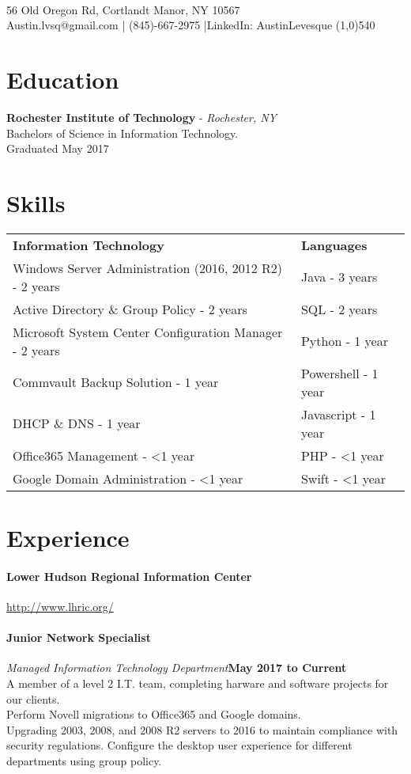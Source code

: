 \documentclass[10pt]{Article}
\begin{document}
\begin{center}
\\
56 Old Oregon Rd, Cortlandt Manor, NY 10567\\
Austin.lvsq@gmail.com | (845)-667-2975 |LinkedIn: AustinLevesque
\line(1,0){540}
\end{center}
\section*{\large Education}
{\bf Rochester Institute of Technology} - {\it Rochester, NY}\\
Bachelors of Science in Information Technology.\\
Graduated May 2017
\section*{\large Skills}
\begin{tabu}{@{}X[4] @{}X[1]}%
\bf Information Technology & \bf Languages \\
Windows Server Administration (2016, 2012 R2) - 2 years & Java - 3 years\\
Active Directory \& Group Policy - 2 years & SQL - 2 years\\
Microsoft System Center Configuration Manager - 2 years & Python - 1 year\\
Commvault Backup Solution - 1 year & Powershell - 1 year\\
DHCP \& DNS - 1 year & Javascript - 1 year\\
Office365 Management - \textless 1 year & PHP - \textless 1 year \\
Google Domain Administration - \textless 1 year & Swift - \textless 1 year
\end{tabu}
\section*{\large Experience}
\paragraph{{\bf Lower Hudson Regional Information Center}}\hfill{\underline {http://www.lhric.org/}~~~}
\paragraph{\bf Junior Network Specialist} {\it Managed Information Technology Department}\hfill {\bf May 2017 to Current}\\
A member of a level 2 I.T. team, completing harware and software projects for our clients.\\
Perform Novell migrations to Office365 and Google domains.\\
Upgrading 2003, 2008, and 2008 R2 servers to 2016 to maintain compliance with security regulations.
Configure the desktop user experience for different departments using group policy.
\end{document}
